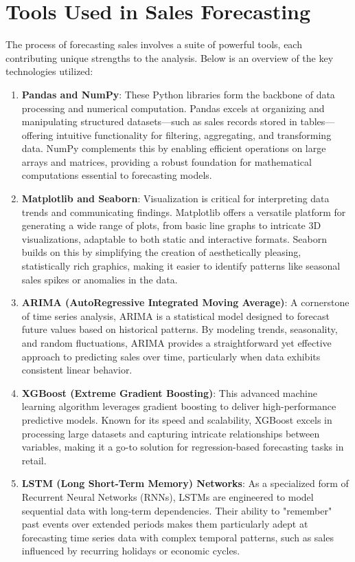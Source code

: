 \section{Tools Used in Sales Forecasting}
The process of forecasting sales involves a suite of powerful tools, each contributing unique strengths to the analysis. Below is an overview of the key technologies utilized:
\begin{enumerate}
    \item \textbf{Pandas and NumPy}: These Python libraries form the backbone of data processing and numerical computation. Pandas excels at organizing and manipulating structured datasets—such as sales records stored in tables—offering intuitive functionality for filtering, aggregating, and transforming data. NumPy complements this by enabling efficient operations on large arrays and matrices, providing a robust foundation for mathematical computations essential to forecasting models.
    
    \item \textbf{Matplotlib and Seaborn}: Visualization is critical for interpreting data trends and communicating findings. Matplotlib offers a versatile platform for generating a wide range of plots, from basic line graphs to intricate 3D visualizations, adaptable to both static and interactive formats. Seaborn builds on this by simplifying the creation of aesthetically pleasing, statistically rich graphics, making it easier to identify patterns like seasonal sales spikes or anomalies in the data.
    
    \item \textbf{ARIMA (AutoRegressive Integrated Moving Average)}: A cornerstone of time series analysis, ARIMA is a statistical model designed to forecast future values based on historical patterns. By modeling trends, seasonality, and random fluctuations, ARIMA provides a straightforward yet effective approach to predicting sales over time, particularly when data exhibits consistent linear behavior.
    
    \item \textbf{XGBoost (Extreme Gradient Boosting)}: This advanced machine learning algorithm leverages gradient boosting to deliver high-performance predictive models. Known for its speed and scalability, XGBoost excels in processing large datasets and capturing intricate relationships between variables, making it a go-to solution for regression-based forecasting tasks in retail.
    
    \item \textbf{LSTM (Long Short-Term Memory) Networks}: As a specialized form of Recurrent Neural Networks (RNNs), LSTMs are engineered to model sequential data with long-term dependencies. Their ability to "remember" past events over extended periods makes them particularly adept at forecasting time series data with complex temporal patterns, such as sales influenced by recurring holidays or economic cycles.
\end{enumerate}

